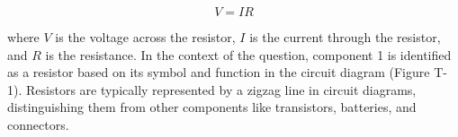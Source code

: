 \[
V = IR
\]

where \( V \) is the voltage across the resistor, \( I \) is the current through the resistor, and \( R \) is the resistance. In the context of the question, component 1 is identified as a resistor based on its symbol and function in the circuit diagram (Figure T-1). Resistors are typically represented by a zigzag line in circuit diagrams, distinguishing them from other components like transistors, batteries, and connectors.

